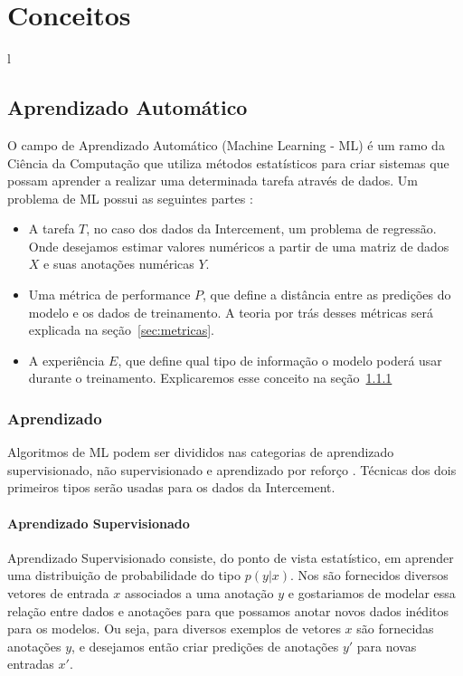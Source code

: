 \chapter{Conceitos}
l\label{cap:conceitos}


\section{Aprendizado Automático}

O campo de Aprendizado Automático (Machine Learning - ML) é um ramo da Ciência
da Computação que utiliza métodos estatísticos para criar sistemas que possam
aprender a realizar uma determinada tarefa através de dados. Um problema de ML possui
as seguintes partes \citep{dlbook}: \\

\begin{itemize}

  
\item A tarefa $T$, no caso dos dados da Intercement, um problema de regressão.
  Onde desejamos estimar valores numéricos a partir de uma matriz de dados $X$ e
  suas anotações numéricas $Y$.  
  
\item Uma métrica de performance $P$, que define a distância entre as predições
  do modelo e os dados de treinamento. A teoria por trás desses métricas será explicada na seção~\ref{sec:metricas}.

\item A experiência $E$, que define qual tipo de informação o modelo poderá usar
  durante o treinamento. Explicaremos esse conceito na seção~\ref{sec:exp} 
  
\end{itemize}

\subsection{Aprendizado}
\label{sec:exp}
Algoritmos de ML podem ser divididos nas categorias de aprendizado supervisionado, não supervisionado e aprendizado por reforço \citep{dlbook}. Técnicas dos dois primeiros tipos serão usadas para os dados da Intercement.


\subsubsection{Aprendizado Supervisionado}
\label{sec:apren} 
Aprendizado Supervisionado consiste, do ponto de vista estatístico, em aprender uma distribuição
de probabilidade do tipo $p(y | x)$. Nos são fornecidos diversos vetores de
entrada $x$ associados a uma anotação $y$ e gostariamos de modelar essa relação
entre dados e anotações para que possamos anotar novos dados inéditos para os
modelos. Ou seja, para diversos exemplos de vetores
$x$ são fornecidas anotações $y$, e desejamos então criar predições de anotações
$y'$ para novas entradas $x'$.


